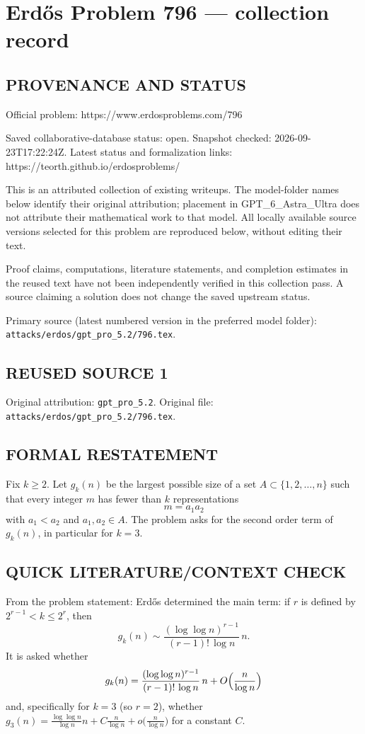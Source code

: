 \section*{Erd\H{o}s Problem 796 --- collection record}

\subsection*{PROVENANCE AND STATUS}
Official problem: https://www.erdosproblems.com/796

Saved collaborative-database status: open.
Snapshot checked: 2026-09-23T17:22:24Z.
Latest status and formalization links: https://teorth.github.io/erdosproblems/

This is an attributed collection of existing writeups. The model-folder names below identify their original attribution; placement in GPT\_6\_Astra\_Ultra does not attribute their mathematical work to that model. All locally available source versions selected for this problem are reproduced below, without editing their text.

Proof claims, computations, literature statements, and completion estimates in the reused text have not been independently verified in this collection pass. A source claiming a solution does not change the saved upstream status.

Primary source (latest numbered version in the preferred model folder): \texttt{attacks/erdos/gpt\_pro\_5.2/796.tex}.

\subsection*{REUSED SOURCE 1}
Original attribution: \texttt{gpt\_pro\_5.2}.
Original file: \texttt{attacks/erdos/gpt\_pro\_5.2/796.tex}.


\subsection*{FORMAL RESTATEMENT}
Fix $k\ge 2$. Let $g_k(n)$ be the largest possible size of a set $A\subset\{1,2,\dots,n\}$ such that every integer $m$ has fewer than $k$ representations
\[
 m=a_1a_2
\]
with $a_1<a_2$ and $a_1,a_2\in A$.
The problem asks for the second order term of $g_k(n)$, in particular for $k=3$.

\subsection*{QUICK LITERATURE/CONTEXT CHECK}
From the problem statement: Erd\H{o}s determined the main term: if $r$ is defined by $2^{r-1}<k\le 2^r$, then
\[
 g_k(n) \sim \frac{(\log\log n)^{r-1}}{(r-1)!\,\log n}\,n.
\]
It is asked whether
\[g_k(n)=\frac{(\log\log n)^{r-1}}{(r-1)!\,\log n}\,n + O\Bigl(\frac{n}{\log n}\Bigr)
\]
and, specifically for $k=3$ (so $r=2$), whether
$g_3(n)=\frac{\log\log n}{\log n}n + C\frac{n}{\log n}+o\bigl(\frac{n}{\log n}\bigr)$
for a constant $C$.


